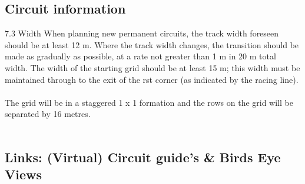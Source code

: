 \documentclass{article}
\begin{document}
\subsection{Circuit information}
7.3 Width
When planning new permanent circuits, the track width foreseen should be at least 12 m. Where the track width changes, the transition should be made as gradually as possible, at a rate not greater than 1 m in 20 m total width. The width of the starting grid should be at least 15 m; this width must be maintained through to the exit of the  rst corner (as indicated by the racing line). \\

\href{appendix\_o\_-\_procedures\_for\_the\_recognition\_of\_motor\_racing\_circuits\_-\_2017.pdf}\\

 The grid will be in a staggered 1 x 1 formation and the rows on the grid will be separated by 16 metres.\\

\href{4.\_formula\_one\_-\_sporting_regulations\_-\_2017.pdf}\\

\subsection{Links: (Virtual) Circuit guide's \& Birds Eye Views}
\end{document}

